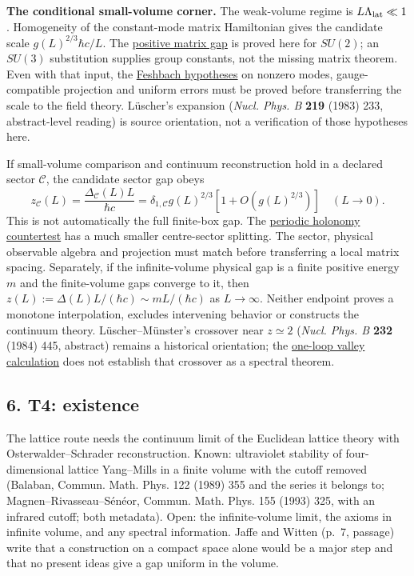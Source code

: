 \documentclass[11pt,a4paper]{article}
\begin{document}
\textbf{The conditional small-volume corner.} The weak-volume regime is
\(L\Lambda_{\rm lat}\ll1\). Homogeneity of the constant-mode matrix
Hamiltonian gives the candidate scale \(g(L)^{2/3}\hbar c/L\). The
\href{low-dimensional-mass-gap.md}{positive matrix gap} is proved here
for \(SU(2)\); an \(SU(3)\) substitution supplies group constants, not
the missing matrix theorem. Even with that input, the
\href{weak-coupling-feshbach-reduction.md}{Feshbach hypotheses} on
nonzero modes, gauge-compatible projection and uniform errors must be
proved before transferring the scale to the field theory. Lüscher's
expansion (\emph{Nucl. Phys. B} \textbf{219} (1983) 233, abstract-level
reading) is source orientation, not a verification of those hypotheses
here.

If small-volume comparison and continuum reconstruction hold in a
declared sector \(\mathcal C\), the candidate sector gap obeys
\[z_{\mathcal C}(L)=\frac{\Delta_{\mathcal C}(L)L}{\hbar c}
=\delta_{1,\mathcal C}g(L)^{2/3}[1+O(g(L)^{2/3})]\quad(L\to0).\] This is
not automatically the full finite-box gap. The
\href{torus-valley-potential.md\#a-centre-odd-variational-countertest}{periodic
holonomy countertest} has a much smaller centre-sector splitting. The
sector, physical observable algebra and projection must match before
transferring a local matrix spacing. Separately, if the infinite-volume
physical gap is a finite positive energy \(m\) and the finite-volume
gaps converge to it, then
\(z(L):=\Delta(L)L/(\hbar c)\sim mL/(\hbar c)\) as \(L\to\infty\).
Neither endpoint proves a monotone interpolation, excludes intervening
behavior or constructs the continuum theory. Lüscher--Münster's
crossover near \(z\simeq2\) (\emph{Nucl. Phys. B} \textbf{232} (1984)
445, abstract) remains a historical orientation; the
\href{torus-valley-potential.md}{one-loop valley calculation} does not
establish that crossover as a spectral theorem.

\subsection{6. T4: existence}\label{t4-existence}

The lattice route needs the continuum limit of the Euclidean lattice
theory with Osterwalder--Schrader reconstruction. Known: ultraviolet
stability of four-dimensional lattice Yang--Mills in a finite volume
with the cutoff removed (Balaban, Commun. Math. Phys. 122 (1989) 355 and
the series it belongs to; Magnen--Rivasseau--Sénéor, Commun. Math. Phys.
155 (1993) 325, with an infrared cutoff; both metadata). Open: the
infinite-volume limit, the axioms in infinite volume, and any spectral
information. Jaffe and Witten (p.~7, passage) write that a construction
on a compact space alone would be a major step and that no present ideas
give a gap uniform in the volume.
\end{document}
